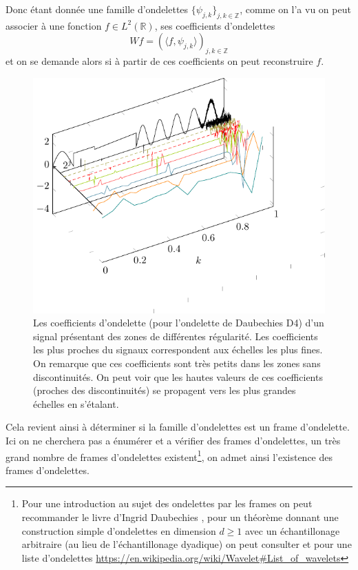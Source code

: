 Donc étant donnée une famille d'ondelettes $\{\psi_{j,k}\}_{j,k \in \mathbb{Z}}$, comme on l'a vu on peut associer à une fonction $f\in L^2(\mathbb{R})$, ses coefficients d'ondelettes
\begin{equation}
	Wf = (\langle f, \psi_{j,k} \rangle )_{j,k \in \mathbb{Z}}
\end{equation}
et on se demande alors si à partir de ces coefficients on peut reconstruire $f$.
\begin{figure}[h]
	\includegraphics{Figs/wavelet}
	\caption{Les coefficients d'ondelette (pour l'ondelette de Daubechies D4) d'un signal présentant des zones de différentes régularité. Les coefficients les plus proches du signaux correspondent aux échelles les plus fines. On remarque que ces coefficients sont très petits dans les zones sans discontinuités. On peut voir que les hautes valeurs de ces coefficients (proches des discontinuités) se propagent vers les plus grandes échelles en s'étalant.}
\end{figure}
Cela revient ainsi à déterminer si la famille d'ondelettes est un frame d'ondelette. 
Ici on ne cherchera pas a énumérer et a vérifier des frames d'ondelettes, un très grand nombre de frames d'ondelettes existent\footnote{Pour une introduction au sujet des ondelettes par les frames on peut recommander le livre d'Ingrid Daubechies \cite{daubbook}, pour un théorème donnant une construction simple d'ondelettes en dimension $d\geq 1$ avec un échantillonage arbitraire (au lieu de l'échantillonage dyadique) on peut consulter \cite{IrregWav} et pour une liste d'ondelettes \url{https://en.wikipedia.org/wiki/Wavelet#List_of_wavelets}}, on admet ainsi l'existence des frames d'ondelettes. 
